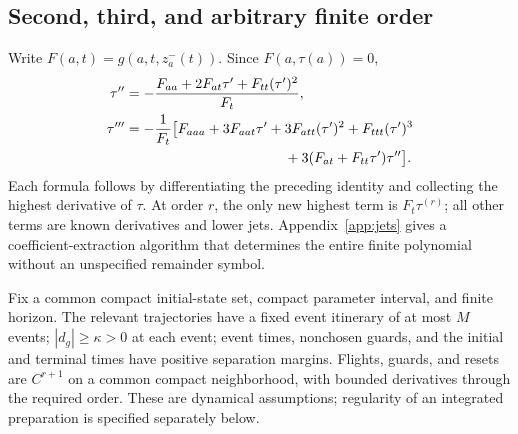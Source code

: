 \subsection{Second, third, and arbitrary finite order}
Write $F(a,t)=g(a,t,z_a^-(t))$. Since $F(a,\tau(a))=0$,
\begin{align}
 \tau''&=-\frac{F_{aa}+2F_{at}\tau'+F_{tt}(\tau')^2}{F_t},\\
 \tau'''&=-\frac{1}{F_t}\bigl[F_{aaa}+3F_{aat}\tau'+3F_{att}(\tau')^2
 +F_{ttt}(\tau')^3\notag\\
 &\hspace{40mm}+3(F_{at}+F_{tt}\tau')\tau''\bigr].
 \label{eq:tau-high}
\end{align}
Each formula follows by differentiating the preceding identity and collecting the highest derivative of $\tau$. At order $r$, the only new highest term is $F_t\tau^{(r)}$; all other terms are known derivatives and lower jets. Appendix~\ref{app:jets} gives a coefficient-extraction algorithm that determines the entire finite polynomial without an unspecified remainder symbol.

\begin{assumption}\label{ass:chamber}
Fix a common compact initial-state set, compact parameter interval, and finite horizon. The relevant trajectories have a fixed event itinerary of at most $M$ events; $|d_g|\ge\kappa>0$ at each event; event times, nonchosen guards, and the initial and terminal times have positive separation margins. Flights, guards, and resets are $C^{r+1}$ on a common compact neighborhood, with bounded derivatives through the required order. These are dynamical assumptions; regularity of an integrated preparation is specified separately below.
\end{assumption}

